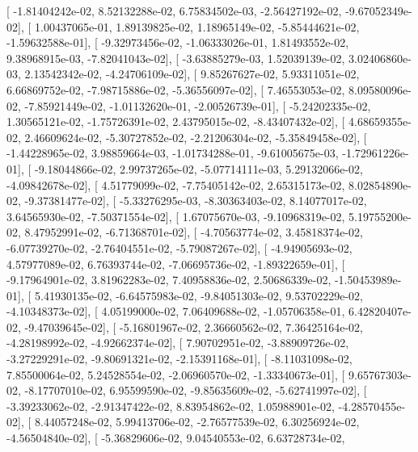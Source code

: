 \documentclass{article}
\begin{document}
       [ -1.81404242e-02,   8.52132288e-02,   6.75834502e-03,
         -2.56427192e-02,  -9.67052349e-02],
       [  1.00437065e-01,   1.89139825e-02,   1.18965149e-02,
         -5.85444621e-02,  -1.59632588e-01],
       [ -9.32973456e-02,  -1.06333026e-01,   1.81493552e-02,
          9.38968915e-03,  -7.82041043e-02],
       [ -3.63885279e-03,   1.52039139e-02,   3.02406860e-03,
          2.13542342e-02,  -4.24706109e-02],
       [  9.85267627e-02,   5.93311051e-02,   6.66869752e-02,
         -7.98715886e-02,  -5.36556097e-02],
       [  7.46553053e-02,   8.09580096e-02,  -7.85921449e-02,
         -1.01132620e-01,  -2.00526739e-01],
       [ -5.24202335e-02,   1.30565121e-02,  -1.75726391e-02,
          2.43795015e-02,  -8.43407432e-02],
       [  4.68659355e-02,   2.46609624e-02,  -5.30727852e-02,
         -2.21206304e-02,  -5.35849458e-02],
       [ -1.44228965e-02,   3.98859664e-03,  -1.01734288e-01,
         -9.61005675e-03,  -1.72961226e-01],
       [ -9.18044866e-02,   2.99737265e-02,  -5.07714111e-03,
          5.29132066e-02,  -4.09842678e-02],
       [  4.51779099e-02,  -7.75405142e-02,   2.65315173e-02,
          8.02854890e-02,  -9.37381477e-02],
       [ -5.33276295e-03,  -8.30363403e-02,   8.14077017e-02,
          3.64565930e-02,  -7.50371554e-02],
       [  1.67075670e-03,  -9.10968319e-02,   5.19755200e-02,
          8.47952991e-02,  -6.71368701e-02],
       [ -4.70563774e-02,   3.45818374e-02,  -6.07739270e-02,
         -2.76404551e-02,  -5.79087267e-02],
       [ -4.94905693e-02,   4.57977089e-02,   6.76393744e-02,
         -7.06695736e-02,  -1.89322659e-01],
       [ -9.17964901e-02,   3.81962283e-02,   7.40958836e-02,
          2.50686339e-02,  -1.50453989e-01],
       [  5.41930135e-02,  -6.64575983e-02,  -9.84051303e-02,
          9.53702229e-02,  -4.10348373e-02],
       [  4.05199000e-02,   7.06409688e-02,  -1.05706358e-01,
          6.42820407e-02,  -9.47039645e-02],
       [ -5.16801967e-02,   2.36660562e-02,   7.36425164e-02,
         -4.28198992e-02,  -4.92662374e-02],
       [  7.90702951e-02,  -3.88909726e-02,  -3.27229291e-02,
         -9.80691321e-02,  -2.15391168e-01],
       [ -8.11031098e-02,   7.85500064e-02,   5.24528554e-02,
         -2.06960570e-02,  -1.33340673e-01],
       [  9.65767303e-02,  -8.17707010e-02,   6.95599590e-02,
         -9.85635609e-02,  -5.62741997e-02],
       [ -3.39233062e-02,  -2.91347422e-02,   8.83954862e-02,
          1.05988901e-02,  -4.28570455e-02],
       [  8.44057248e-02,   5.99413706e-02,  -2.76577539e-02,
          6.30256924e-02,  -4.56504840e-02],
       [ -5.36829606e-02,   9.04540553e-02,   6.63728734e-02,
\end{document}
